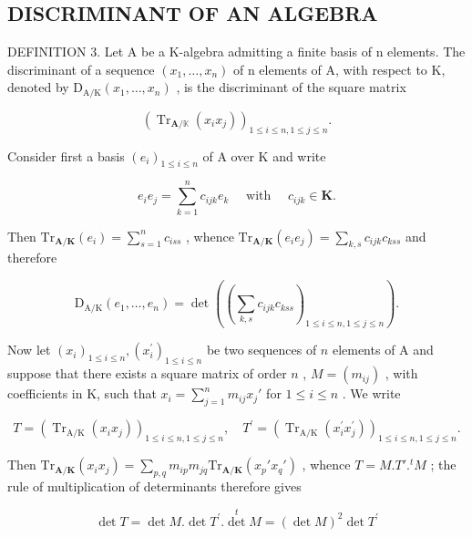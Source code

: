 \subsection{DISCRIMINANT OF AN ALGEBRA}

DEFINITION 3. Let A be a K-algebra admitting a finite basis of n elements. The discriminant of a sequence \((x_{1},\ldots,x_{n})\) of n elements of A, with respect to K, denoted by \(\mathrm{D}_{\mathrm{A}/\mathrm{K}}(x_{1},\ldots,x_{n})\) , is the discriminant of the square matrix

\[
\left(\operatorname{Tr} _ {\mathbf {A} / \mathbb {K}} \left(x _ {i} x _ {j}\right)\right) _ {1 \leqslant i \leqslant n, 1 \leqslant j \leqslant n}.
\]

Consider first a basis \((e_i)_{1\leqslant i\leqslant n}\) of A over K and write

\[
e _ {i} e _ {j} = \sum_ {k = 1} ^ {n} c _ {i j k} e _ {k} \quad \text { with } \quad c _ {i j k} \in \mathbf {K}.\tag{30}
\]

Then \(\mathrm{Tr}_{\mathbf{A} / \mathbf{K}}(e_i) = \sum_{s=1}^{n} c_{iss}\) , whence \(\mathrm{Tr}_{\mathbf{A} / \mathbf{K}}(e_i e_j) = \sum_{k,s} c_{ijk} c_{kss}\) and therefore

\[
\mathrm{D} _ {\mathrm{A} / \mathrm{K}} (e _ {1}, \dots , e _ {n}) = \det \left(\left(\sum_ {k, s} c _ {i j k} c _ {k s s}\right) _ {1 \leqslant i \leqslant n, 1 \leqslant j \leqslant n}\right).\tag{31}
\]

Now let \((x_{i})_{1\leqslant i\leqslant n},(x_{i}^{\prime})_{1\leqslant i\leqslant n}\) be two sequences of \(n\) elements of A and suppose that there exists a square matrix of order \(n\) , \(M = (m_{ij})\) , with coefficients in K, such that \(x_{i} = \sum_{j=1}^{n} m_{ij} x_{j}'\) for \(1 \leqslant i \leqslant n\) . We write

\[
T = \left(\operatorname{Tr} _ {\mathrm{A} / \mathrm{K}} \left(x _ {i} x _ {j}\right)\right) _ {1 \leqslant i \leqslant n, 1 \leqslant j \leqslant n}, \quad T ^ {\prime} = \left(\operatorname{Tr} _ {\mathrm{A} / \mathrm{K}} \left(x _ {i} ^ {\prime} x _ {j} ^ {\prime}\right)\right) _ {1 \leqslant i \leqslant n, 1 \leqslant j \leqslant n}.
\]

Then \(\mathrm{Tr}_{\mathbf{A} / \mathbf{K}}(x_i x_j) = \sum_{p,q} m_{ip} m_{jq} \mathrm{Tr}_{\mathbf{A} / \mathbf{K}}(x_p' x_q')\) , whence \(T = M. T'.^t M\) ; the rule of multiplication of determinants therefore gives

\[
\det T = \det M. \det T ^ {\prime}. \det ^ {t} M = (\det M) ^ {2} \det T ^ {\prime}
\]

